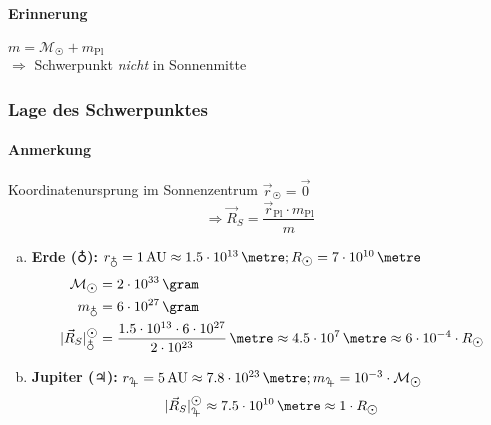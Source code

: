\paragraph{Erinnerung} $m = \mathcal M_{\astrosun} + m_{\mathrm{Pl}}$\\
    $\Rightarrow$ Schwerpunkt \emph{nicht} in Sonnenmitte

\subsubsection{Lage des Schwerpunktes}
\paragraph{Anmerkung} Koordinatenursprung im Sonnenzentrum $\vec r_{\astrosun} = \vec 0$
\[ \Rightarrow \vec R_S = \frac{\vec r_{\mathrm{Pl}} \cdot m_{\mathrm{Pl}}}{m} \]
\begin{enumerate}[a)]
    \item \textbf{Erde ($\mathbf{\earth}$):} $r_{\earth} = 1\,\mathrm{AU} \approx 1.5 \cdot 10^{13}\,\metre; R_{\astrosun} = 7 \cdot 10^{10}\,\metre$
        \begin{align*}
            \mathcal{M}_{\astrosun} &= 2 \cdot 10^{33}\,\gram\\
            m_{\earth} &= 6 \cdot 10^{27}\,\gram\\
            |\vec R_S|_{\earth}^{\astrosun} &= \frac{1.5 \cdot 10^{13} \cdot 6 \cdot 10^{27}}{2 \cdot 10^{23}}\,\metre \approx 4.5 \cdot 10^7\,\metre \approx 6 \cdot 10^{-4} \cdot R_{\astrosun}
        \end{align*}
    \item \textbf{Jupiter ($\mathbf{\jupiter}$):} $r_{\jupiter} = 5\,\mathrm{AU} \approx 7.8 \cdot 10^{23}\,\metre; m_{\jupiter} = 10^{-3} \cdot \mathcal M_{\astrosun}$
        \[ |\vec R_S|_{\jupiter}^{\astrosun} \approx 7.5 \cdot 10^{10}\,\metre \approx 1 \cdot R_{\astrosun} \]
\end{enumerate}
